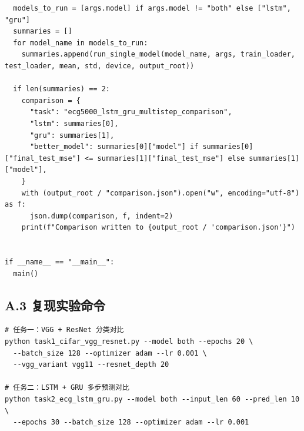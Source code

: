 \documentclass[12pt,a4paper]{ctexart}
\begin{document}
\begin{lstlisting}
  models_to_run = [args.model] if args.model != "both" else ["lstm", "gru"]
  summaries = []
  for model_name in models_to_run:
    summaries.append(run_single_model(model_name, args, train_loader, test_loader, mean, std, device, output_root))

  if len(summaries) == 2:
    comparison = {
      "task": "ecg5000_lstm_gru_multistep_comparison",
      "lstm": summaries[0],
      "gru": summaries[1],
      "better_model": summaries[0]["model"] if summaries[0]["final_test_mse"] <= summaries[1]["final_test_mse"] else summaries[1]["model"],
    }
    with (output_root / "comparison.json").open("w", encoding="utf-8") as f:
      json.dump(comparison, f, indent=2)
    print(f"Comparison written to {output_root / 'comparison.json'}")


if __name__ == "__main__":
  main()
\end{lstlisting}

\subsection*{A.3 复现实验命令}
\begin{verbatim}
# 任务一：VGG + ResNet 分类对比
python task1_cifar_vgg_resnet.py --model both --epochs 20 \
  --batch_size 128 --optimizer adam --lr 0.001 \
  --vgg_variant vgg11 --resnet_depth 20

# 任务二：LSTM + GRU 多步预测对比
python task2_ecg_lstm_gru.py --model both --input_len 60 --pred_len 10 \
  --epochs 30 --batch_size 128 --optimizer adam --lr 0.001
\end{verbatim}
\end{document}
